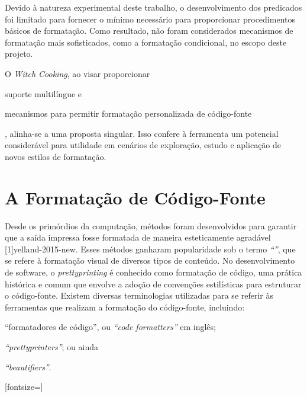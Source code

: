 \documentclass
  [11pt,a4paper,english,brazil,openright,sumario=tradicional,twoside]
  {abntex2}
\newcommand{\witchcooking}{\textit{Witch Cooking}\xspace}
\begin{document}
  Devido à natureza experimental deste trabalho, o desenvolvimento dos
  predicados foi limitado para fornecer o mínimo necessário para proporcionar
  procedimentos básicos de formatação. Como resultado, não foram considerados
  mecanismos de formatação mais sofisticados, como a formatação condicional, no
  escopo deste projeto.

  O \witchcooking, ao visar proporcionar
  \begin{inparaenum}
    \item suporte multilíngue e
    \item mecanismos para permitir formatação personalizada de código-fonte%
  \end{inparaenum}
  , alinha-se a uma proposta singular. Isso confere à ferramenta um potencial
  considerável para utilidade em cenários de exploração, estudo e aplicação de
  novos estilos de formatação.


  \chapter{A Formatação de Código-Fonte}
  \label{chapter:src-fmt}

  Desde os primórdios da computação, métodos foram desenvolvidos para garantir
  que a saída impressa fosse formatada de maneira esteticamente agradável
  [1]{yelland-2015-new}. Esses métodos ganharam
  popularidade sob o termo \textit{``''}, que se refere à
  formatação visual de diversos tipos de conteúdo. No desenvolvimento de
  software, o \textit{prettyprinting} é conhecido como formatação de código,
  uma prática histórica e comum que envolve a adoção de convenções estilísticas
  para estruturar o código-fonte. Existem diversas terminologias utilizadas
  para se referir às ferramentas que realizam a formatação do código-fonte,
  incluindo:
  \begin{inparaenum}
    \item ``formatadores de código'', ou \textit{``code formatters''} em
          inglês;
    \item \textit{``prettyprinters''}; ou ainda
    \item \textit{``beautifiers''}.
  \end{inparaenum}

  \newsavebox\mexpressionexample
  \begin{lrbox}{\mexpressionexample}
    [fontsize=\footnotesize]
  \end{lrbox}
\end{document}
